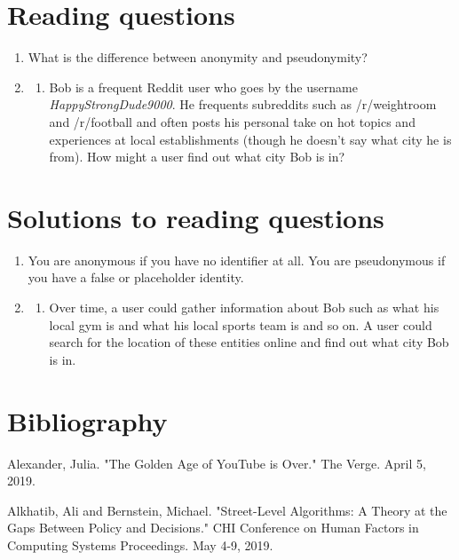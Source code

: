 \documentclass[class=book, crop=false]{standalone}
\begin{document}
\section{Reading questions}

\begin{enumerate}
    \item What is the difference between anonymity and pseudonymity?
    
    \item
    \begin{enumerate}
        \item Bob is a frequent Reddit user who goes by the username \textit{HappyStrongDude9000}. He frequents subreddits such as /r/weightroom and /r/football and often posts his personal take on hot topics and experiences at local establishments (though he doesn't say what city he is from). How might a user find out what city Bob is in?
    \end{enumerate}
\end{enumerate}

\section{Solutions to reading questions}

\begin{enumerate}
    \item You are anonymous if you have no identifier at all. You are pseudonymous if you have a false or placeholder identity.
    
    \item
    \begin{enumerate}
        \item Over time, a user could gather information about Bob such as what his local gym is and what his local sports team is and so on. A user could search for the location of these entities online and find out what city Bob is in.
    \end{enumerate}
\end{enumerate}

\section{Bibliography}

Alexander, Julia. "The Golden Age of YouTube is Over." The Verge. April 5, 2019.

Alkhatib, Ali and Bernstein, Michael. "Street-Level Algorithms: A Theory at the Gaps Between Policy and Decisions." CHI Conference on Human Factors in Computing Systems Proceedings. May 4-9, 2019.
\end{document}
